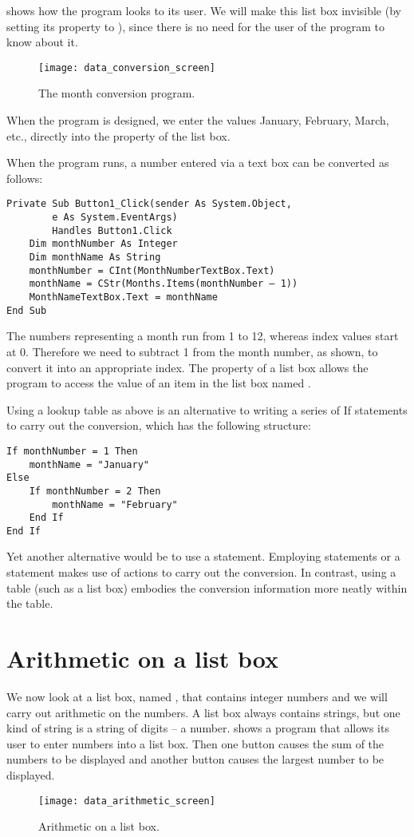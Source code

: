 		 shows how the program looks to its user. We will make this list box invisible (by setting its  property to ), since there is no need for the user of the program to know about it.
		\begin{figure}[bth]
			\centering
			\texttt{[image: data\_conversion\_screen]}
			\caption{The month conversion program.}
			\label{fig:data_conversion_screen}
		\end{figure}

		When the program is designed, we enter the values January, February, March, etc., directly into the  property of the list box.
		
		When the program runs, a number entered via a text box can be converted as follows:
		\begin{lstlisting}
Private Sub Button1_Click(sender As System.Object,
		e As System.EventArgs)
		Handles Button1.Click
	Dim monthNumber As Integer
	Dim monthName As String
	monthNumber = CInt(MonthNumberTextBox.Text)
	monthName = CStr(Months.Items(monthNumber – 1))
	MonthNameTextBox.Text = monthName
End Sub
		\end{lstlisting}
		The numbers representing a month run from 1 to 12, whereas index values start at 0. Therefore we need to subtract 1 from the month number, as shown, to convert it into an appropriate index. The  property of a list box allows the program to access the value of an item in the list box named .
		
		Using a lookup table as above is an alternative to writing a series of If statements to carry out the conversion, which has the following structure:
		\begin{lstlisting}
If monthNumber = 1 Then
	monthName = "January"
Else
	If monthNumber = 2 Then
		monthName = "February"
	End If
End If
		\end{lstlisting}
		Yet another alternative would be to use a  statement. Employing  statements or a  statement makes use of actions to carry out the conversion. In contrast, using a table (such as a list box) embodies the conversion information more neatly within the table.


	\section{Arithmetic on a list box}
		We now look at a list box, named , that contains integer numbers and we will carry out arithmetic on the numbers. A list box always contains strings, but one kind of string is a string of digits – a number.  shows a program that allows its user to enter numbers into a list box. Then one button causes the sum of the numbers to be displayed and another button causes the largest number to be displayed.
		\begin{figure}[bth]
			\centering
			\texttt{[image: data\_arithmetic\_screen]}
			\caption{Arithmetic on a list box.}
			\label{fig:data_arithmetic_screen}
		\end{figure}
		
